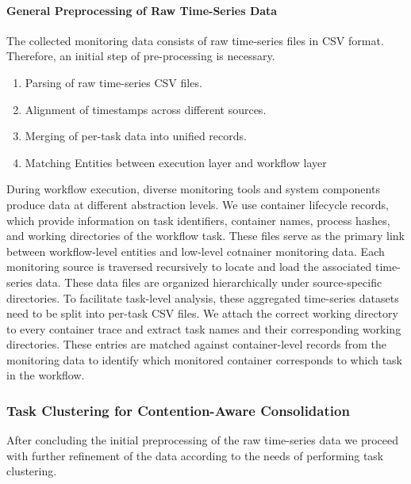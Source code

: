 \paragraph{General Preprocessing of Raw Time-Series Data}
\label{sec:data_preprocessing_general}

The collected monitoring data consists of raw time-series files in CSV format. Therefore, an initial step of pre-processing is necessary.

\begin{enumerate}
    \item Parsing of raw time-series CSV files.
    \item Alignment of timestamps across different sources.
    \item Merging of per-task data into unified records.
    \item Matching Entities between execution layer and workflow layer
\end{enumerate}

During workflow execution, diverse monitoring tools and system components produce data at different abstraction levels.
We use container lifecycle records, which provide information on task identifiers, container names, process hashes, and working directories of the workflow task. These files serve as the primary link between workflow-level entities and low-level cotnainer monitoring data. Each monitoring source is traversed recursively to locate and load the associated time-series data. These data files are organized hierarchically under source-specific directories. To facilitate task-level analysis, these aggregated time-series datasets need to be split into per-task CSV files.
We attach the correct working directory to every container trace and extract task names and their corresponding working directories. These entries are matched against container-level records from the monitoring data to identify which monitored container corresponds to which task in the workflow.

\subsubsection{Task Clustering for Contention-Aware Consolidation}
\label{sec:task_clustering}

After concluding the initial preprocessing of the raw time-series data we proceed with further refinement of the data according to the needs of performing task clustering.


